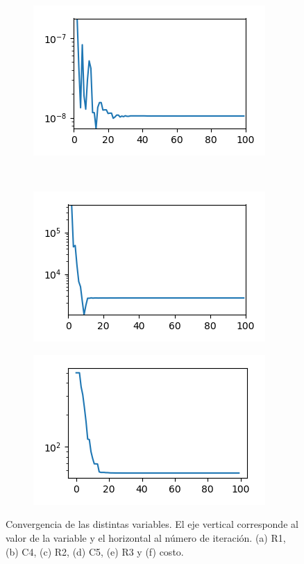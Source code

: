 \documentclass{llncs}
\begin{document}
\begin{figure}[!h]
\begin{subfigure}{0.5\textwidth}
			\caption{}
			\label{fig:F-r2}
		\end{subfigure}%
		\begin{subfigure}{0.5\textwidth}
			\centering
			\includegraphics[scale=0.7]{ContinuoLibre/cc-c5}
			\caption{}
			\label{fig:F-c5}
		\end{subfigure}   \\                                                         
		\begin{subfigure}{0.5\textwidth}
			\centering
			\includegraphics[scale=0.7]{ContinuoLibre/cc-r3}
			\caption{}
			\label{fig:F-r3}
		\end{subfigure}%
		\begin{subfigure}{0.5\textwidth}
			\centering
			\includegraphics[scale=0.7]{ContinuoLibre/cc-costo}
			\caption{}
			\label{fig:F-costo}
		\end{subfigure}                                                            
		\caption{Convergencia de las distintas variables. El eje vertical corresponde
			al valor de la variable y el horizontal al número de iteración. (a) R1, (b)
			C4, (c) R2, (d) 
			C5, (e) R3 y (f) costo. }                                                                                  
		\label{fig:FF}                                                                                  
	\end{figure}
	
\end{document}

